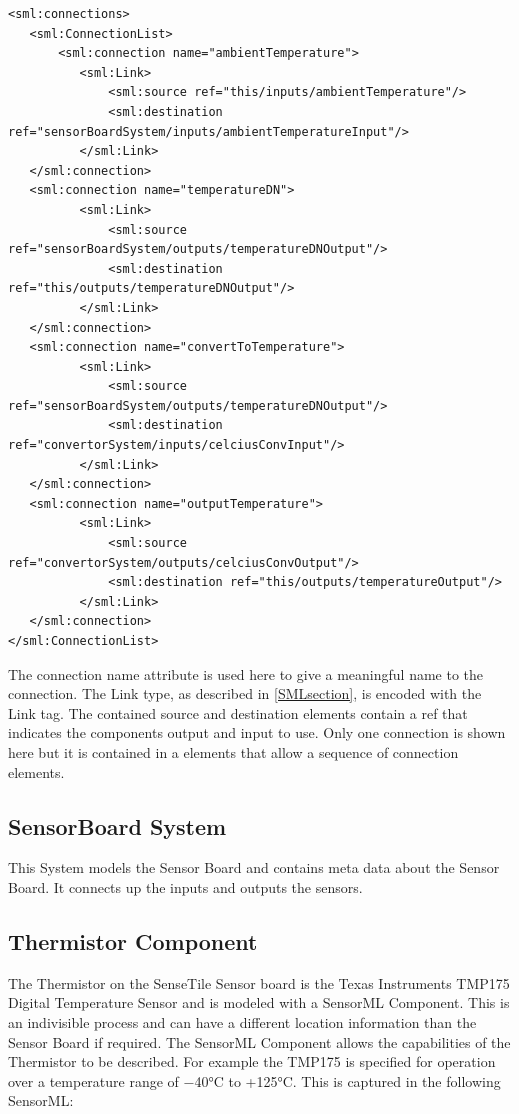 \documentclass[]{final_report}
\begin{document}
\begin{lstlisting}
<sml:connections>
   <sml:ConnectionList>
       <sml:connection name="ambientTemperature">
          <sml:Link>
              <sml:source ref="this/inputs/ambientTemperature"/>
              <sml:destination ref="sensorBoardSystem/inputs/ambientTemperatureInput"/>
          </sml:Link>
   </sml:connection>
   <sml:connection name="temperatureDN">
          <sml:Link>
              <sml:source ref="sensorBoardSystem/outputs/temperatureDNOutput"/>
              <sml:destination ref="this/outputs/temperatureDNOutput"/>
          </sml:Link>
   </sml:connection>
   <sml:connection name="convertToTemperature">
          <sml:Link>
              <sml:source ref="sensorBoardSystem/outputs/temperatureDNOutput"/>
              <sml:destination ref="convertorSystem/inputs/celciusConvInput"/>
          </sml:Link>
   </sml:connection>
   <sml:connection name="outputTemperature">
          <sml:Link>
              <sml:source ref="convertorSystem/outputs/celciusConvOutput"/>
              <sml:destination ref="this/outputs/temperatureOutput"/>
          </sml:Link>
   </sml:connection>
</sml:ConnectionList>
\end{lstlisting}

The connection name attribute is used here to give a meaningful name to the connection. The Link type, as described in \ref{SMLsection}, is encoded with the Link tag. The contained source and destination elements contain a ref that indicates the components output and input to use. Only one connection is shown here but it is contained in a elements that allow a sequence of connection elements. 
  
\subsection{SensorBoard System}

This System models the Sensor Board and contains meta data about the Sensor Board. It connects up the inputs and outputs the sensors.

\subsection{Thermistor Component}
The Thermistor on the SenseTile Sensor board is the Texas Instruments TMP175 Digital Temperature Sensor and is modeled with a SensorML Component. This is an indivisible process and can have a different location information than the Sensor Board if required. The SensorML Component allows the capabilities of the Thermistor to be described. For example the TMP175 is  specified for operation over a temperature range of −40°C to +125°C. This is captured in the following SensorML:
\end{document}
